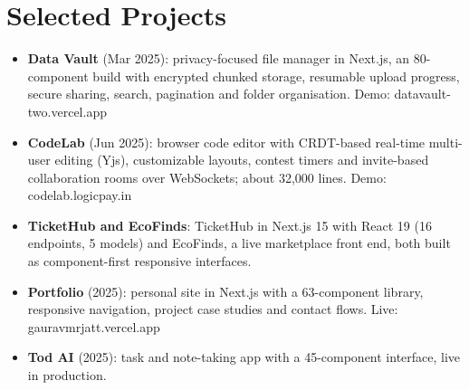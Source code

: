 \documentclass[11pt,a4paper,sans]{moderncv}
\begin{document}
\vspace{2pt}



\section{Selected Projects}
\vspace{1pt}
\begin{itemize}
    \item {\textbf{Data Vault} (Mar 2025): privacy-focused file manager in Next.js, an 80-component build with encrypted chunked storage, resumable upload progress, secure sharing, search, pagination and folder organisation. Demo: datavault-two.vercel.app}
    \item {\textbf{CodeLab} (Jun 2025): browser code editor with CRDT-based real-time multi-user editing (Yjs), customizable layouts, contest timers and invite-based collaboration rooms over WebSockets; about 32,000 lines. Demo: codelab.logicpay.in}
    \item {\textbf{TicketHub and EcoFinds}: TicketHub in Next.js 15 with React 19 (16 endpoints, 5 models) and EcoFinds, a live marketplace front end, both built as component-first responsive interfaces.}
    \item {\textbf{Portfolio} (2025): personal site in Next.js with a 63-component library, responsive navigation, project case studies and contact flows. Live: gauravmrjatt.vercel.app}
    \item {\textbf{Tod AI} (2025): task and note-taking app with a 45-component interface, live in production.}
\end{itemize}
\end{document}
